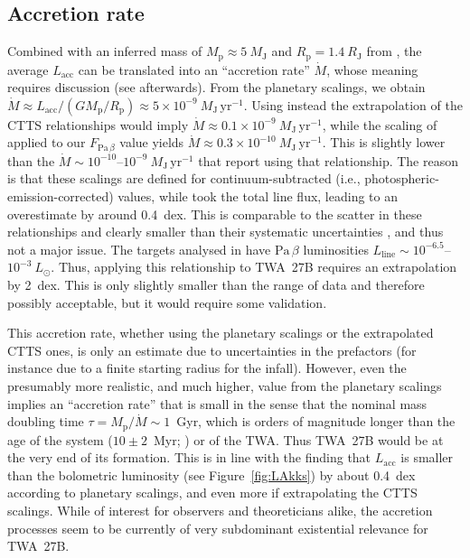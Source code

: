 \documentclass[twocolumn,twocolumnappendix]{aastex631}
\def\MJ{\ensuremath{M_{\textrm{J}}}\xspace}        %
\def\RJ{\ensuremath{R_{\textrm{J}}}\xspace}        %
\def\LSonne{\ensuremath{L_\odot}\xspace}           %
\def\Pab{\ensuremath{\mathrm{Pa}\,\beta}\xspace}            %
\def\MPkt{\ensuremath{\dot{M}}\xspace}                               %
\def\MP{\ensuremath{M_{\textrm{p}}}\xspace}        %
\def\RP{\ensuremath{R_{\textrm{p}}}\xspace}        %
\newcommand{\Lacc}{\ensuremath{{L_{\textrm{acc}}}}\xspace}  %
\def\LAkk{\Lacc}
\def\FPab{\ensuremath{F_{\textrm{Pa}\,\beta}}\xspace}    %
\def\LLinie{\ensuremath{L_{\textrm{line}}}\xspace}                      %
\def\MPktEJ{\ensuremath{\MJ\,\textrm{yr}^{-1}}\xspace}        %
\def\twb{TWA~27B\xspace}
\begin{document}
%

\subsection{Accretion rate}

Combined with an inferred mass of $\MP\approx5~\MJ$ and $\RP=1.4~\RJ$ from \citet{luhman23c},
the average \LAkk can be translated into an ``accretion rate'' \MPkt, whose meaning requires discussion (see afterwards).
From the planetary scalings, we obtain
%
%
%
$\MPkt\approx\LAkk/(G\MP/\RP) \approx 5\times10^{-9}~\MPktEJ$.
%
%
%
%
%
%
%
Using instead the extrapolation of the \citet{alcal17} CTTS relationships would imply $\MPkt\approx0.1\times10^{-9}~\MPktEJ$,
while the scaling of \citet{natta04} applied to our \FPab value yields
%
%
%
$\MPkt\approx0.3\times10^{-10}~\MPktEJ$.
%
%
%
%
This is slightly lower than the $\MPkt\sim10^{-10}$--$10^{-9}~\MPktEJ$ that \citet{luhman23c} report using that relationship.
The reason is that these scalings are defined for continuum-subtracted (i.e., photospheric-emission-corrected) values, while \citet{luhman23c} took the total line flux, leading to an overestimate by
%
%
around 0.4~dex. This is comparable to the scatter in these relationships
and clearly smaller than their systematic uncertainties \citep{betti23},
and thus not a major issue.
The targets analysed in \citet{alcal17} have \Pab luminosities $\LLinie\sim10^{-6.5}$--$10^{-3}~\LSonne$.
%
%
Thus, applying this relationship to \twb requires an extrapolation by 2~dex. This is only slightly smaller than the range of data and therefore possibly acceptable, but it would require some validation.


%
%
%
%
%
%
%
%
%
%
%
%
%
%
%
%
%
%
%
%
%
%
%
%
%
%


This accretion rate, whether using the planetary scalings or the extrapolated CTTS ones, is only an estimate due to uncertainties in the prefactors (for instance due to a finite starting radius for the infall).
However, even the presumably more realistic, and much higher, value from the planetary scalings implies an ``accretion rate'' that is small in the sense that the nominal mass doubling time
%
$\tau=\MP/\MPkt\sim1$~Gyr, which is orders of magnitude longer than the age of the system ($10\pm2$~Myr; \citealt{luhman23b}) or of the TWA.
Thus \twb would be at the very end of its formation.
This is in line with the finding that \LAkk is smaller than the bolometric luminosity (see Figure~\ref{fig:LAkks}) by about 0.4~dex according to planetary scalings, and even more if extrapolating the CTTS scalings. While of interest for observers and theoreticians alike, the accretion processes seem to be currently of very subdominant existential relevance for \twb.
\end{document}
